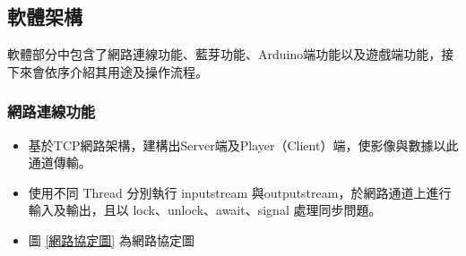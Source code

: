 \documentclass[12pt]{article}  %
\theoremstyle{plain}
\begin{document}
\subsection{軟體架構}
軟體部分中包含了網路連線功能、藍芽功能、Arduino端功能以及遊戲端功能，接下來會依序介紹其用途及操作流程。

\subsubsection{網路連線功能}
\begin{itemize}
\item 基於TCP網路架構，建構出Server端及Player（Client）端，使影像與數據以此通道傳輸。
\item 使用不同 Thread 分別執行 inputstream 與outputstream，於網路通道上進行輸入及輸出，且以 lock、unlock、await、signal 處理同步問題。
\item 圖 \ref{網路協定圖} 為網路協定圖
\begin{figure}[htbp]
\quad
{}
\quad
{}
\end{figure}
\end{itemize}
\end{document}
